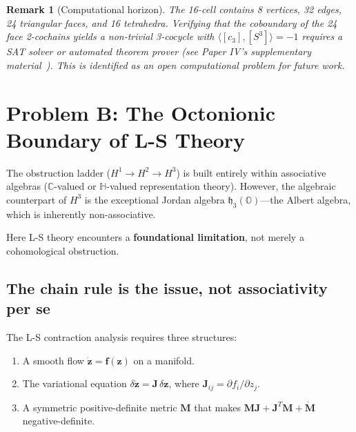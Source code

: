 \documentclass[11pt]{article}
\newtheorem{remark}[theorem]{Remark}
\begin{document}
\begin{remark}[Computational horizon]
\label{rem:computational}
The 16-cell contains 8 vertices, 32 edges, 24 triangular faces, and
16 tetrahedra. Verifying that the coboundary of the 24 face 2-cochains
yields a non-trivial 3-cocycle with $\langle [c_3], [S^3] \rangle = -1$
requires a SAT solver or automated theorem prover (see Paper IV's
supplementary material~\cite{PaperIV}). This is identified as an open
computational problem for future work.
\end{remark}

\section{Problem B: The Octonionic Boundary of L-S Theory}
\label{sec:octonionic-boundary}

The obstruction ladder ($H^1 \to H^2 \to H^3$) is built entirely within
associative algebras ($\mathbb{C}$-valued or $\mathbb{H}$-valued
representation theory). However, the algebraic counterpart of $H^3$
is the exceptional Jordan algebra $\mathfrak{h}_3(\mathbb{O})$---the
Albert algebra, which is inherently non-associative.

Here L-S theory encounters a \textbf{foundational limitation}, not
merely a cohomological obstruction.

\subsection{The chain rule is the issue, not associativity per se}
\label{sec:chain-rule}

The L-S contraction analysis requires three structures:
\begin{enumerate}
  \item A smooth flow $\dot{\mathbf{z}} = \mathbf{f}(\mathbf{z})$ on a manifold.
  \item The variational equation $\delta\dot{\mathbf{z}} = \mathbf{J}\,\delta\mathbf{z}$,
    where $\mathbf{J}_{ij} = \partial f_i / \partial z_j$.
  \item A symmetric positive-definite metric $\mathbf{M}$ that makes
    $\mathbf{M}\mathbf{J} + \mathbf{J}^T\mathbf{M} + \dot{\mathbf{M}}$ negative-definite.
\end{enumerate}
\end{document}
